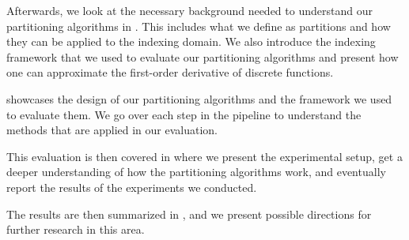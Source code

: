 \noindent Afterwards, we look at the necessary background needed to understand our partitioning algorithms in . This includes what we define as partitions and how they can be applied to the indexing domain. We also introduce the indexing framework that we used to evaluate our partitioning algorithms and present how one can approximate the first-order derivative of discrete functions. 

\noindent {} showcases the design of our partitioning algorithms and the framework we used to evaluate them. We go over each step in the pipeline to understand the methods that are applied in our evaluation.

\noindent This evaluation is then covered in  where we present the experimental setup, get a deeper understanding of how the partitioning algorithms work, and eventually report the results of the experiments we conducted.

\noindent The results are then summarized in , and we present possible directions for further research in this area.

